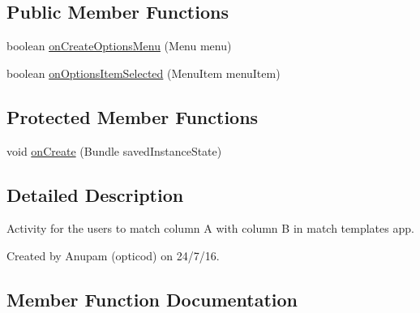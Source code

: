 \subsection*{Public Member Functions}
\begin{DoxyCompactItemize}
\item 
boolean \hyperlink{classorg_1_1buildmlearn_1_1matchtemplate_1_1activities_1_1MainActivity_aa9f87a5cfca41fc6448f7479ade395bf}{on\+Create\+Options\+Menu} (Menu menu)
\item 
boolean \hyperlink{classorg_1_1buildmlearn_1_1matchtemplate_1_1activities_1_1MainActivity_a8ff3019bc1e2b6dde94ecbf03077e321}{on\+Options\+Item\+Selected} (Menu\+Item menu\+Item)
\end{DoxyCompactItemize}
\subsection*{Protected Member Functions}
\begin{DoxyCompactItemize}
\item 
void \hyperlink{classorg_1_1buildmlearn_1_1matchtemplate_1_1activities_1_1MainActivity_ad9854e41d280ad0266edb99e24b118e6}{on\+Create} (Bundle saved\+Instance\+State)
\end{DoxyCompactItemize}


\subsection{Detailed Description}
Activity for the users to match column A with column B in match template\textquotesingle{}s app. 

Created by Anupam (opticod) on 24/7/16. 

\subsection{Member Function Documentation}
